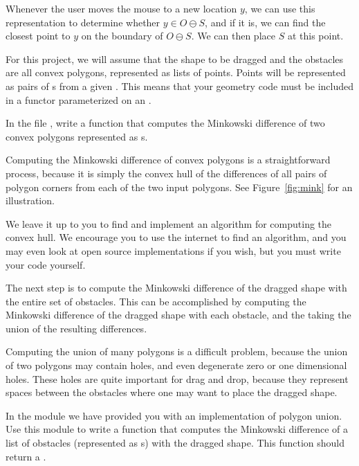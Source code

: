\documentclass{pset}
\begin{document}
Whenever the user moves the mouse to a new location $y$, we can use this
representation to determine whether $y \in O \ominus S$, and if it is, we can
find the closest point to $y$ on the boundary of $O \ominus S$.  We can then
place $S$ at this point.

For this project, we will assume that the shape to be dragged and the obstacles
are all convex polygons, represented as lists of points.  Points will be
represented as pairs of s from a given .
This means that your geometry code must be included in a functor parameterized
on an .

In the file , write a function
 that computes the Minkowski difference of
two convex polygons represented as s.

Computing the Minkowski difference of convex polygons is a straightforward
process, because it is simply the convex hull of the differences of all pairs
of polygon corners from each of the two input polygons.  See
Figure~\ref{fig:mink} for an illustration.

We leave it up to you to find and implement an algorithm for computing the
convex hull.  We encourage you to use the internet to find an algorithm, and
you may even look at open source implementations if you wish, but you must
write your code yourself.

The next step is to compute the Minkowski difference of the dragged shape with
the entire set of obstacles.  This can be accomplished by computing the
Minkowski difference of the dragged shape with each obstacle, and the taking
the union of the resulting differences.

Computing the union of many polygons is a difficult problem, because the union
of two polygons may contain holes, and even degenerate zero or one dimensional
holes.  These holes are quite important for drag and drop, because they
represent spaces between the obstacles where one may want to place the dragged
shape.

In the  module we have provided you with an implementation of
polygon union.  Use this module to write a function 
that computes the Minkowski difference of a list of obstacles (represented as
s) with the dragged shape.  This function should return a
.
\end{document}
